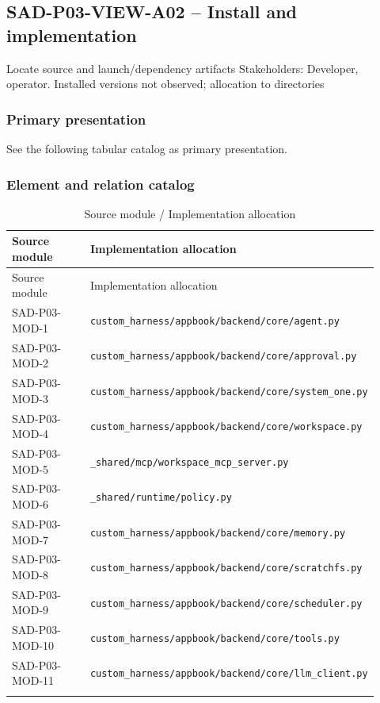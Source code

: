 \documentclass[10pt,letterpaper]{article}
\begin{document}
\subsection{SAD-P03-VIEW-A02 -- Install and implementation}
Locate source and launch/dependency artifacts Stakeholders: Developer, operator. Installed versions not observed; allocation to directories
\subsubsection{Primary presentation}
See the following tabular catalog as primary presentation.
\subsubsection{Element and relation catalog}
\begin{longtable}{@{}>{\raggedright\arraybackslash}p{0.24\linewidth}>{\raggedright\arraybackslash}p{0.68\linewidth}@{}}
\caption{Source module / Implementation allocation}\\
\toprule Source module & Implementation allocation\\\midrule\endfirsthead
\toprule Source module & Implementation allocation\\\midrule\endhead
SAD-P03-MOD-1 & \nolinkurl{custom_harness/appbook/backend/core/agent.py}\\\addlinespace
SAD-P03-MOD-2 & \nolinkurl{custom_harness/appbook/backend/core/approval.py}\\\addlinespace
SAD-P03-MOD-3 & \nolinkurl{custom_harness/appbook/backend/core/system_one.py}\\\addlinespace
SAD-P03-MOD-4 & \nolinkurl{custom_harness/appbook/backend/core/workspace.py}\\\addlinespace
SAD-P03-MOD-5 & \nolinkurl{_shared/mcp/workspace_mcp_server.py}\\\addlinespace
SAD-P03-MOD-6 & \nolinkurl{_shared/runtime/policy.py}\\\addlinespace
SAD-P03-MOD-7 & \nolinkurl{custom_harness/appbook/backend/core/memory.py}\\\addlinespace
SAD-P03-MOD-8 & \nolinkurl{custom_harness/appbook/backend/core/scratchfs.py}\\\addlinespace
SAD-P03-MOD-9 & \nolinkurl{custom_harness/appbook/backend/core/scheduler.py}\\\addlinespace
SAD-P03-MOD-10 & \nolinkurl{custom_harness/appbook/backend/core/tools.py}\\\addlinespace
SAD-P03-MOD-11 & \nolinkurl{custom_harness/appbook/backend/core/llm_client.py}\\\addlinespace

\end{longtable}
\end{document}
